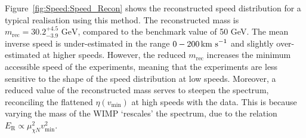 Figure~\ref{fig:Speed:Speed_Recon} shows the reconstructed speed distribution for a typical realisation using this method. The reconstructed mass is $m_\textrm{rec} = 30.2^{+4.5}_{-3.9} \textrm{ GeV}$, compared to the benchmark value of 50 GeV. The mean inverse speed is under-estimated in the range \(0 - 200 \,\textrm{km s}^{-1}\) and slightly over-estimated at higher speeds. However, the reduced \(m_\textrm{rec}\) increases the minimum accessible speed of the experiments, meaning that the experiments are less sensitive to the shape of the speed distribution at low speeds. Moreover, a reduced value of the reconstructed mass serves to steepen the spectrum, reconciling the flattened \(\eta(v_\textrm{min})\) at high speeds with the data. This is because varying the mass of the WIMP `rescales' the spectrum, due to the relation \(E_\textrm{R} \propto \mu_{\chi N}^2 v_{\textrm{min}}^2\).


